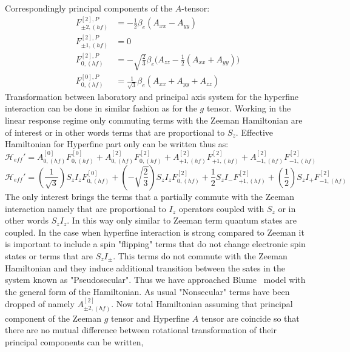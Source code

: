 Correspondingly principal components of the $A$-tensor: 
\begin{subequations}\label{eq:HyperAA}
\begin{align}
F^{[2],P}_{\pm2,(hf)} & =-\frac{1}{2}\beta_e(A_{xx}-A_{yy})\\
F^{[2],P}_{\pm1,(hf)} & =0\\
F^{[2],P}_{0,(hf)} & =-\sqrt{\frac{2}{3}}\beta_e\big(A_{zz}-\frac{1}{2}(A_{xx}+A_{yy})\big)\\
F^{[0],P}_{0,(hf)} & = \frac{1}{\sqrt{3}}\beta_e(A_{xx}+A_{yy}+A_{zz})
\end{align}
\end{subequations}
Transformation between laboratory and principal axis system for the hyperfine interaction can be done in similar fashion as for the $g$ tensor. Working in the linear response regime only commuting terms with the Zeeman Hamiltonian are of interest or in other words terms that are proportional to $S_z$. Effective Hamiltonian for Hyperfine part only can be written thus as: 
\begin{equation}
\mathcal{H}_{eff}'=A_{0,(hf)}^{[0]}F_{0,(hf)}^{[0]}+A_{0,(hf)}^{[2]} F_{0,(hf)}^{[2]}+A_{+1,(hf)}^{[2]} F_{+1,(hf)}^{[2]}+A_{-1,(hf)}^{[2]} F_{-1,(hf)}^{[2]}
\end{equation}
\begin{equation}
\mathcal{H}_{eff}'=(\frac{1}{\sqrt{3}})S_zI_zF_{0,(hf)}^{[0]}+(-\sqrt{\frac{2}{3}})S_zI_zF_{0,(hf)}^{[2]}+\frac{1}{2}S_zI_- F_{+1,(hf)}^{[2]}+(\frac{1}{2})S_zI_+ F_{-1,(hf)}^{[2]}
\end{equation}
The only interest brings the terms that a partially commute with the Zeeman interaction namely that are proportional to $I_z$ operators coupled with $S_z$ or in other words $S_zI_z$. In this way only similar to Zeeman term quantum states are coupled. In the case when hyperfine interaction is strong compared to Zeeman it is important to include a spin "flipping" terms that do not change electronic spin states or terms that are $S_zI_{\pm}$. This terms do not commute with the Zeeman Hamiltonian and they induce additional transition between the sates in the system known as "Pseudosecular". Thus we have approached Blume~\cite{blume} model with the general form of the Hamiltonian. As usual "Nonsecular" terms have been dropped of namely $A_{\pm2,(hf)}^{[2]}$. Now total Hamiltonian assuming that principal component of the Zeeman $g$ tensor and Hyperfine $A$ tensor are coincide so that there are no mutual difference between rotational transformation of their principal components can be written,

